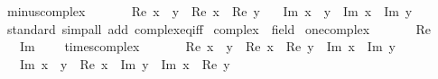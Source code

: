 \begin{isabellebody}
\isanewline
{}\isamarkupfalse%
\ minus{\isacharunderscore}{\kern0pt}complex\isanewline
\ \ \isanewline
\ \ \ \ {\isachardoublequoteopen}Re\ {\isacharparenleft}{\kern0pt}x\ {\isacharminus}{\kern0pt}\ y{\isacharparenright}{\kern0pt}\ {\isacharequal}{\kern0pt}\ Re\ x\ {\isacharminus}{\kern0pt}\ Re\ y{\isachardoublequoteclose}\isanewline
\ \ {\isacharbar}{\kern0pt}\ {\isachardoublequoteopen}Im\ {\isacharparenleft}{\kern0pt}x\ {\isacharminus}{\kern0pt}\ y{\isacharparenright}{\kern0pt}\ {\isacharequal}{\kern0pt}\ Im\ x\ {\isacharminus}{\kern0pt}\ Im\ y{\isachardoublequoteclose}\isanewline
\isanewline
{}\isamarkupfalse%
\isanewline
%
\isadelimproof
\ \ %
\endisadelimproof
%
\isatagproof
{}\isamarkupfalse%
\ standard\ {\isacharparenleft}{\kern0pt}simp{\isacharunderscore}{\kern0pt}all\ add{\isacharcolon}{\kern0pt}\ complex{\isacharunderscore}{\kern0pt}eq{\isacharunderscore}{\kern0pt}iff{\isacharparenright}{\kern0pt}%
\endisatagproof
{\isafoldproof}%
%
\isadelimproof
\isanewline
%
\endisadelimproof
\isanewline
{}\isamarkupfalse%
%
\isadelimdocument
%
\endisadelimdocument
%
\isatagdocument
%
\isamarkuptrue%
%
\endisatagdocument
{\isafolddocument}%
%
\isadelimdocument
%
\endisadelimdocument
{}\isamarkupfalse%
\ complex\ {\isacharcolon}{\kern0pt}{\isacharcolon}{\kern0pt}\ field\isanewline
{}\isanewline
\isanewline
{}\isamarkupfalse%
\ one{\isacharunderscore}{\kern0pt}complex\isanewline
\ \ \isanewline
\ \ \ \ {\isachardoublequoteopen}Re\ {}\ {\isacharequal}{\kern0pt}\ {}{\isachardoublequoteclose}\isanewline
\ \ {\isacharbar}{\kern0pt}\ {\isachardoublequoteopen}Im\ {}\ {\isacharequal}{\kern0pt}\ {}{\isachardoublequoteclose}\isanewline
\isanewline
{}\isamarkupfalse%
\ times{\isacharunderscore}{\kern0pt}complex\isanewline
\ \ \isanewline
\ \ \ \ {\isachardoublequoteopen}Re\ {\isacharparenleft}{\kern0pt}x\ {\isacharasterisk}{\kern0pt}\ y{\isacharparenright}{\kern0pt}\ {\isacharequal}{\kern0pt}\ Re\ x\ {\isacharasterisk}{\kern0pt}\ Re\ y\ {\isacharminus}{\kern0pt}\ Im\ x\ {\isacharasterisk}{\kern0pt}\ Im\ y{\isachardoublequoteclose}\isanewline
\ \ {\isacharbar}{\kern0pt}\ {\isachardoublequoteopen}Im\ {\isacharparenleft}{\kern0pt}x\ {\isacharasterisk}{\kern0pt}\ y{\isacharparenright}{\kern0pt}\ {\isacharequal}{\kern0pt}\ Re\ x\ {\isacharasterisk}{\kern0pt}\ Im\ y\ {\isacharplus}{\kern0pt}\ Im\ x\ {\isacharasterisk}{\kern0pt}\ Re\ y{\isachardoublequoteclose}\isanewline

\end{isabellebody}
